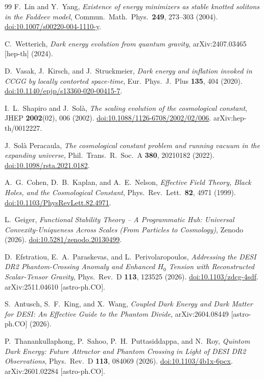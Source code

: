 \documentclass[12pt,a4paper]{article}
\theoremstyle{definition}
\theoremstyle{plain}
\theoremstyle{remark}
\begin{document}
\begin{thebibliography}{99}
F.~Lin and Y.~Yang,
\textit{Existence of energy minimizers as stable knotted solitons in the Faddeev model},
Commun.\ Math.\ Phys.\ \textbf{249}, 273--303 (2004).
\href{https://doi.org/10.1007/s00220-004-1110-y}{doi:10.1007/s00220-004-1110-y}.

C.~Wetterich,
\textit{Dark energy evolution from quantum gravity},
arXiv:2407.03465 [hep-th] (2024).

D.~Vasak, J.~Kirsch, and J.~Struckmeier,
\textit{Dark energy and inflation invoked in CCGG by locally contorted space-time},
Eur.\ Phys.\ J.\ Plus \textbf{135}, 404 (2020).
\href{https://doi.org/10.1140/epjp/s13360-020-00415-7}{doi:10.1140/epjp/s13360-020-00415-7}.

I.~L.~Shapiro and J.~Solà,
\textit{The scaling evolution of the cosmological constant},
JHEP \textbf{2002}(02), 006 (2002).
\href{https://doi.org/10.1088/1126-6708/2002/02/006}{doi:10.1088/1126-6708/2002/02/006}.
arXiv:hep-th/0012227.

J.~Solà Peracaula,
\textit{The cosmological constant problem and running vacuum in the expanding universe},
Phil.\ Trans.\ R.\ Soc.\ A \textbf{380}, 20210182 (2022).
\href{https://doi.org/10.1098/rsta.2021.0182}{doi:10.1098/rsta.2021.0182}.

A.~G.~Cohen, D.~B.~Kaplan, and A.~E.~Nelson,
\textit{Effective Field Theory, Black Holes, and the Cosmological Constant},
Phys.\ Rev.\ Lett.\ \textbf{82}, 4971 (1999).
\href{https://doi.org/10.1103/PhysRevLett.82.4971}{doi:10.1103/PhysRevLett.82.4971}.

L.~Geiger,
\textit{Functional Stability Theory -- A Programmatic Hub: Universal Convexity-Uniqueness Across Scales (From Particles to Cosmology)},
Zenodo (2026).
\href{https://doi.org/10.5281/zenodo.20130499}{doi:10.5281/zenodo.20130499}.

D.~Efstratiou, E.~A.~Paraskevas, and L.~Perivolaropoulos,
\textit{Addressing the DESI DR2 Phantom-Crossing Anomaly and Enhanced $H_0$ Tension with Reconstructed Scalar-Tensor Gravity},
Phys.\ Rev.\ D \textbf{113}, 123525 (2026).
\href{https://doi.org/10.1103/zdcg-4sdf}{doi:10.1103/zdcg-4sdf}.
arXiv:2511.04610 [astro-ph.CO].

S.~Antusch, S.~F.~King, and X.~Wang,
\textit{Coupled Dark Energy and Dark Matter for DESI: An Effective Guide to the Phantom Divide},
arXiv:2604.08449 [astro-ph.CO] (2026).

P.~Thanankullaphong, P.~Sahoo, P.~H.~Puttasiddappa, and N.~Roy,
\textit{Quintom Dark Energy: Future Attractor and Phantom Crossing in Light of DESI DR2 Observations},
Phys.\ Rev.\ D \textbf{113}, 084069 (2026).
\href{https://doi.org/10.1103/4b1x-6pcx}{doi:10.1103/4b1x-6pcx}.
arXiv:2601.02284 [astro-ph.CO].

\end{thebibliography}
\end{document}
